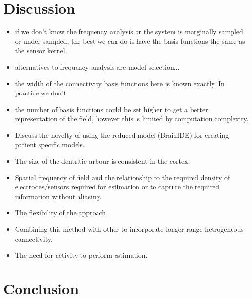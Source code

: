 \documentclass[12pt]{iopart}		%
\begin{document}
\section{Discussion}

\begin{itemize}
	\item if we don't know the frequency analysis or the system is marginally sampled or under-sampled, the best we can do is have the basis functions the same as the sensor kernel.
	\item alternatives to frequency analysis are model selection...
	\item the width of the connectivity basis functions here is known exactly. In practice we don't 
	\item the number of basis functions could be set higher to get a better representation of the field, however this is limited by computation complexity.
	\item Discuss the novelty of using the reduced model (BrainIDE) for creating patient specific models. 
	\item The size of the dentritic arbour is consistent in the cortex.
	\item Spatial frequency of field and the relationship to the required density of electrodes/sensors required for estimation or to capture the required information without aliasing.
	\item The flexibility of the approach
	\item Combining this method with other to incorporate longer range hetrogeneous connectivity.	
	\item The need for activity to perform estimation.
\end{itemize}

\section{Conclusion}
\appendix
\end{document}
